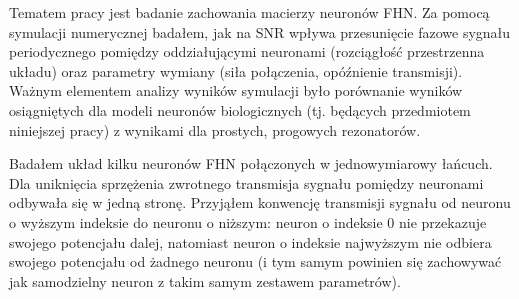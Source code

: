   Tematem pracy jest badanie zachowania macierzy neuronów FHN. Za pomocą symulacji numerycznej badałem, jak na SNR wpływa przesunięcie fazowe sygnału periodycznego pomiędzy oddziałującymi neuronami (rozciągłość przestrzenna układu) oraz parametry wymiany (siła połączenia, opóźnienie transmisji). Ważnym elementem analizy wyników symulacji było porównanie wyników osiągniętych dla modeli neuronów biologicznych (tj. będących przedmiotem niniejszej pracy) z wynikami dla prostych, progowych rezonatorów.

  Badałem układ kilku neuronów FHN połączonych w jednowymiarowy łańcuch. Dla uniknięcia sprzężenia zwrotnego transmisja sygnału pomiędzy neuronami odbywała się w jedną stronę. Przyjąłem konwencję transmisji sygnału od neuronu o wyższym indeksie do neuronu o niższym: neuron o indeksie 0 nie przekazuje swojego potencjału dalej, natomiast neuron o indeksie najwyższym nie odbiera swojego potencjału od żadnego neuronu (i tym samym powinien się zachowywać jak samodzielny neuron z takim samym zestawem parametrów).

